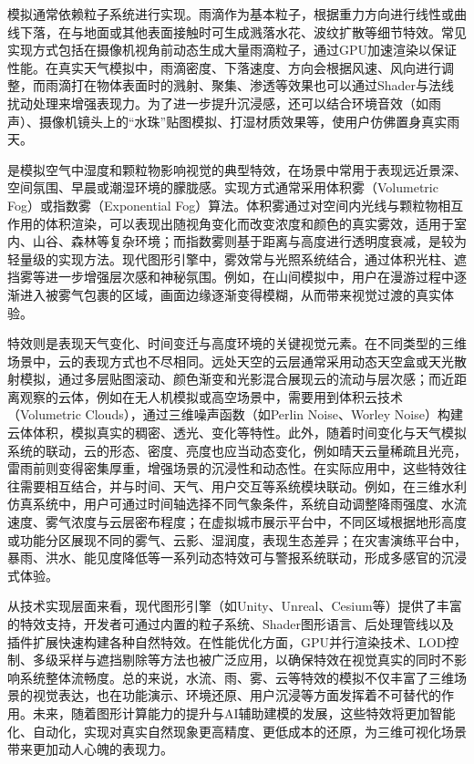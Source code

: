 模拟通常依赖粒子系统进行实现。雨滴作为基本粒子，根据重力方向进行线性或曲线下落，在与地面或其他表面接触时可生成溅落水花、波纹扩散等细节特效。常见实现方式包括在摄像机视角前动态生成大量雨滴粒子，通过GPU加速渲染以保证性能。在真实天气模拟中，雨滴密度、下落速度、方向会根据风速、风向进行调整，而雨滴打在物体表面时的溅射、聚集、渗透等效果也可以通过Shader与法线扰动处理来增强表现力。为了进一步提升沉浸感，还可以结合环境音效（如雨声）、摄像机镜头上的``水珠''贴图模拟、打湿材质效果等，使用户仿佛置身真实雨天。

是模拟空气中湿度和颗粒物影响视觉的典型特效，在场景中常用于表现远近景深、空间氛围、早晨或潮湿环境的朦胧感。实现方式通常采用体积雾（Volumetric Fog）或指数雾（Exponential Fog）算法。体积雾通过对空间内光线与颗粒物相互作用的体积渲染，可以表现出随视角变化而改变浓度和颜色的真实雾效，适用于室内、山谷、森林等复杂环境；而指数雾则基于距离与高度进行透明度衰减，是较为轻量级的实现方法。现代图形引擎中，雾效常与光照系统结合，通过体积光柱、遮挡雾等进一步增强层次感和神秘氛围。例如，在山间模拟中，用户在漫游过程中逐渐进入被雾气包裹的区域，画面边缘逐渐变得模糊，从而带来视觉过渡的真实体验。

特效则是表现天气变化、时间变迁与高度环境的关键视觉元素。在不同类型的三维场景中，云的表现方式也不尽相同。远处天空的云层通常采用动态天空盒或天光散射模拟，通过多层贴图滚动、颜色渐变和光影混合展现云的流动与层次感；而近距离观察的云体，例如在无人机模拟或高空场景中，需要用到体积云技术（Volumetric Clouds），通过三维噪声函数（如Perlin Noise、Worley Noise）构建云体体积，模拟真实的稠密、透光、变化等特性。此外，随着时间变化与天气模拟系统的联动，云的形态、密度、亮度也应当动态变化，例如晴天云量稀疏且光亮，雷雨前则变得密集厚重，增强场景的沉浸性和动态性。在实际应用中，这些特效往往需要相互结合，并与时间、天气、用户交互等系统模块联动。例如，在三维水利仿真系统中，用户可通过时间轴选择不同气象条件，系统自动调整降雨强度、水流速度、雾气浓度与云层密布程度；在虚拟城市展示平台中，不同区域根据地形高度或功能分区展现不同的雾气、云影、湿润度，表现生态差异；在灾害演练平台中，暴雨、洪水、能见度降低等一系列动态特效可与警报系统联动，形成多感官的沉浸式体验。

从技术实现层面来看，现代图形引擎（如Unity、Unreal、Cesium等）提供了丰富的特效支持，开发者可通过内置的粒子系统、Shader图形语言、后处理管线以及插件扩展快速构建各种自然特效。在性能优化方面，GPU并行渲染技术、LOD控制、多级采样与遮挡剔除等方法也被广泛应用，以确保特效在视觉真实的同时不影响系统整体流畅度。总的来说，水流、雨、雾、云等特效的模拟不仅丰富了三维场景的视觉表达，也在功能演示、环境还原、用户沉浸等方面发挥着不可替代的作用。未来，随着图形计算能力的提升与AI辅助建模的发展，这些特效将更加智能化、自动化，实现对真实自然现象更高精度、更低成本的还原，为三维可视化场景带来更加动人心魄的表现力。

